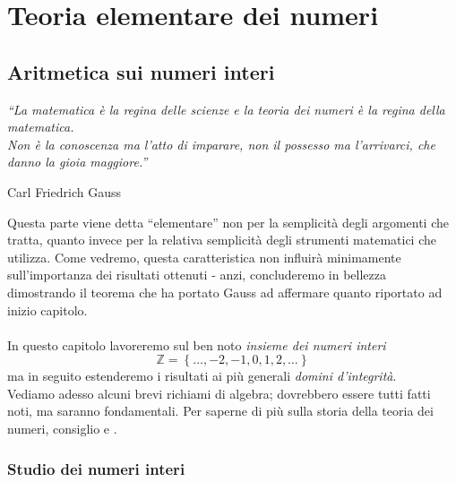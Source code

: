 \part{Teoria elementare dei numeri}




\chapter{Aritmetica sui numeri interi}
\label{lezione1}
\epigraph{\textit{\enquote{La matematica è la regina delle scienze e la teoria dei numeri è la regina della matematica. \\ Non è la conoscenza ma l'atto di imparare, non il possesso ma l'arrivarci, che danno la gioia maggiore.}}}{Carl Friedrich Gauss}
Questa parte viene detta \enquote{elementare} non per la semplicità degli argomenti che tratta, quanto invece per la relativa semplicità degli strumenti matematici che utilizza. Come vedremo, questa caratteristica non influirà minimamente sull'importanza dei risultati ottenuti - anzi, concluderemo in bellezza dimostrando il teorema che ha portato Gauss ad affermare quanto riportato ad inizio capitolo. \\ \\
In questo capitolo lavoreremo sul ben noto \textit{insieme dei numeri interi}
\begin{equation*}
	\mathbb{Z}= \left\{\dots,-2,-1,0,1,2,\dots\right\}
\end{equation*}
ma in seguito estenderemo i risultati ai più generali \textit{domini d'integrità}. \\ 
Vediamo adesso alcuni brevi richiami di algebra; dovrebbero essere tutti fatti noti, ma saranno fondamentali. Per saperne di più sulla storia della teoria dei numeri, consiglio \cite{D19} e \cite{G97}.


\section{Studio dei numeri interi}
